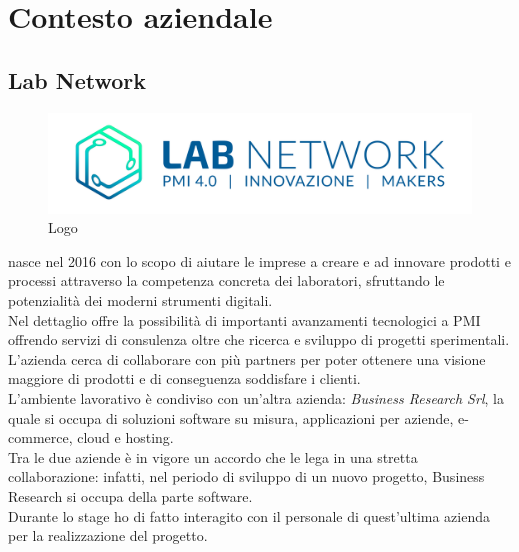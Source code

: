 
\chapter{Contesto aziendale}
\label{cap:introduzione}

\section{Lab Network}

\begin{figure}[H]
	\begin{center}
	\includegraphics[scale=0.4]{immagini/LOGO_LABNETWORK.png}
	\caption{Logo \lab{}}
	\end{center}
\end{figure}

\lab{} nasce nel 2016 con lo scopo di aiutare le imprese a creare e ad innovare prodotti e processi attraverso la competenza concreta dei laboratori, sfruttando le potenzialità dei moderni strumenti digitali.\\
Nel dettaglio \lab{} offre la possibilità di importanti avanzamenti tecnologici a PMI offrendo servizi di consulenza oltre che ricerca e sviluppo di progetti sperimentali.\\
L'azienda cerca di collaborare con più partners per poter ottenere una visione maggiore di prodotti e di conseguenza soddisfare i clienti.\\
L’ambiente lavorativo è condiviso con un’altra azienda: \textit{Business Research Srl}, la quale si occupa di soluzioni software su misura, applicazioni per aziende, e-commerce, cloud e hosting.\\
Tra le due aziende è in vigore un accordo che le lega in una stretta collaborazione: infatti, nel periodo di sviluppo di un nuovo progetto, Business Research si occupa della parte software.\\
Durante lo stage ho di fatto interagito con il personale di quest’ultima azienda per la realizzazione del progetto.

